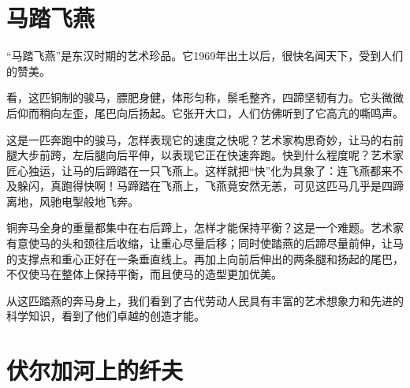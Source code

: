 \documentclass[12pt,UTF-8,openany]{ctexbook}
\begin{document}
\chapter{马踏飞燕}

\begin{large}
    
    “马踏飞燕”是东汉时期的艺术珍品。它1969年出土以后，很快名闻天下，受到人们的赞美。
    
    看，这匹铜制的骏马，膘肥身健，体形匀称，鬃毛整齐，四蹄坚韧有力。它头微微后仰而稍向左歪，尾巴向后扬起。它张开大口，人们仿佛听到了它高亢的嘶鸣声。
    
    这是一匹奔跑中的骏马，怎样表现它的速度之快呢？艺术家构思奇妙，让马的右前腿大步前跨，左后腿向后平伸，以表现它正在快速奔跑。快到什么程度呢？艺术家匠心独运，让马的后蹄踏在一只飞燕上。这样就把“快”化为具象了：连飞燕都来不及躲闪，真跑得快啊！马蹄踏在飞燕上，飞燕竟安然无恙，可见这匹马几乎是四蹄离地，风驰电掣般地飞奔。
    
    铜奔马全身的重量都集中在右后蹄上，怎样才能保持平衡？这是一个难题。艺术家有意使马的头和颈往后收缩，让重心尽量后移；同时使踏燕的后蹄尽量前伸，让马的支撑点和重心正好在一条垂直线上。再加上向前后伸出的两条腿和扬起的尾巴，不仅使马在整体上保持平衡，而且使马的造型更加优美。
    
    从这匹踏燕的奔马身上，我们看到了古代劳动人民具有丰富的艺术想象力和先进的科学知识，看到了他们卓越的创造才能。
    
\end{large}



\chapter{伏尔加河上的纤夫}
\end{document}
